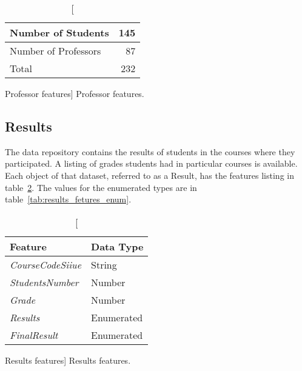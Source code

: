 \begin{table}[h!]
    \centering

    \begin{tabular}{| l | r |}
        \hline
        Number of Students   & 145 \\ \hline
        Number of Professors & 87  \\ \hline
        Total                & 232 \\ \hline
    \end{tabular}

    \caption
        [Professor features]
        {Professor features.}

    \label{tab:moodle_users_stats}
\end{table}

\subsection{Results}
\label{sec:results}

The data repository contains the results of students in the courses where they
participated. A listing of grades students had in particular courses is
available. Each object of that dataset, referred to as a Result, has the
features listing in table~\ref{tab:results_fetures}. The values for the
enumerated types are in table~\ref{tab:results_fetures_enum}.

\begin{table}[h!]
    \centering

    \begin{tabular}{l l}
        Feature                  & Data Type  \\ \hline
        \textit{CourseCodeSiiue} & String     \\
        \textit{StudentsNumber}  & Number     \\
        \textit{Grade}           & Number     \\
        \textit{Results}         & Enumerated \\
        \textit{FinalResult}     & Enumerated \\
    \end{tabular}

    \caption
        [Results features]
        {Results features.}

    \label{tab:results_fetures}
\end{table}

